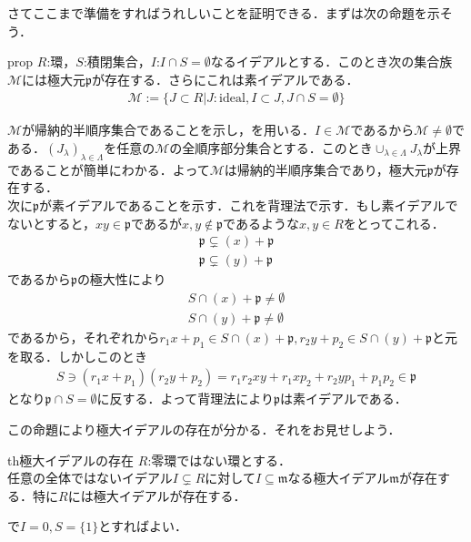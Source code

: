\documentclass[11pt]{jsarticle}
\newcommand{\mf}[1]{\mathfrak{#1}} %
\begin{document}
さてここまで準備をすればうれしいことを証明できる．まずは次の命題を示そう．
\begin{statesp}[2.4]{prop}{}
    $R$:環，$S$:積閉集合，$I$:$I \cap S = \emptyset$なるイデアルとする．このとき次の集合族$\mathcal{M}$には極大元$\mf{p}$が存在する．さらにこれは素イデアルである．
    \begin{align}
        \mathcal{M} := \{ J \subset R \vert J:\mathrm{ideal}, I \subset J, J \cap S = \emptyset \}
    \end{align}
\end{statesp}
\begin{pfsp}
    $\mathcal{M}$が帰納的半順序集合であることを示し，を用いる．$I \in \mathcal{M}$であるから$\mathcal{M} \neq \emptyset$である．$(J_{\lambda})_{\lambda \in \Lambda}$を任意の$\mathcal{M}$の全順序部分集合とする．このとき$\displaystyle{\cup_{\lambda \in \Lambda}J_{\lambda}}$が上界であることが簡単にわかる．よって$\mathcal{M}$は帰納的半順序集合であり，極大元$\mf{p}$が存在する．\\
    次に$\mf{p}$が素イデアルであることを示す．これを背理法で示す．もし素イデアルでないとすると，$xy \in \mf{p}$であるが$x,y \notin \mf{p}$であるような$x,y \in R$をとってこれる．
    \begin{align}
        \mf{p} \subsetneq (x) + \mf{p} \\
        \mf{p} \subsetneq (y) + \mf{p}
    \end{align}
    であるから$\mf{p}$の極大性により
    \begin{align}
        S \cap (x) + \mf{p} \neq \emptyset \\
        S \cap (y) + \mf{p} \neq \emptyset
    \end{align}
    であるから，それぞれから$r_1x + p_1 \in S \cap (x) + \mf{p}, r_2y + p_2 \in S \cap (y) + \mf{p}$と元を取る．しかしこのとき
    \begin{align}
        S \ni (r_1x + p_1)(r_2y + p_2) = r_1r_2xy + r_1xp_2 + r_2yp_1 + p_1p_2 \in \mf{p}
    \end{align}
    となり$\mf{p} \cap S = \emptyset$に反する．よって背理法により$\mf{p}$は素イデアルである．
\end{pfsp}
この命題により極大イデアルの存在が分かる．それをお見せしよう．
\begin{statesp}{th}{極大イデアルの存在}
    $R$:零環ではない環とする．\\
    任意の全体ではないイデアル$I \subsetneq R$に対して$I \subseteq \mf{m}$なる極大イデアル$\mf{m}$が存在する．特に$R$には極大イデアルが存在する．
\end{statesp}
\begin{pfsp}
    で$I = 0,S = \{1\}$とすればよい．
\end{pfsp}
\end{document}
